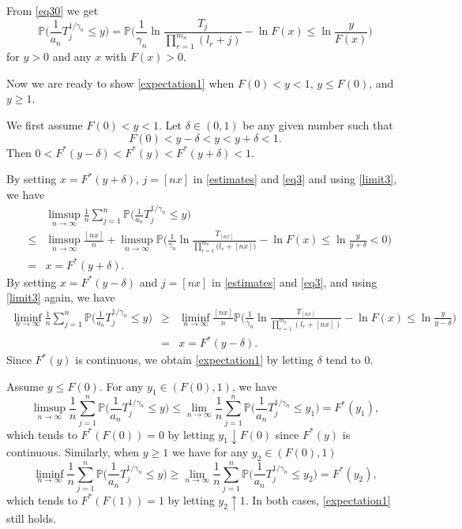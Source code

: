 \documentclass[11pt]{article}
\numberwithin{equation}{section}
\begin{document}
From \eqref{eq30} we get
\begin{equation}\label{eq3}
\mathbb{P}\Big(\frac{1}{a_n}T_j^{1 / \gamma_{n}} \leq y\Big)=
\mathbb{P}\Big(\frac{1}{\gamma_{n}} \ln
\frac{T_{j}}{\prod_{r=1}^{m_{n}}\left(l_{r}+j\right)}-\ln F(x) \leq
\ln \frac{y}{F(x)}\Big)
\end{equation}
for $y>0$ and any $x$ with $F(x)>0$.


Now we are ready to show \eqref{expectation1} when $F(0)<y<1$,
$y\leq F(0)$,  and $y\geq 1$.


We first assume $F(0)<y<1$.  Let $\delta \in(0,1)$ be any given
number such that
\[F(0)< y-\delta<y<y+\delta<1.\]
Then $0<F^{*}(y-\delta)<F^{*}(y)<F^{*}(y+\delta)<1$.

By setting $x=F^{*}(y+\delta)$, $j=[nx]$ in \eqref{estimates} and
\eqref{eq3} and using \eqref{limit3},  we have
\begin{eqnarray*}
&& \limsup_{n \rightarrow \infty}  \frac{1}{n} \sum_{j=1}^{n} \mathbb{P}\Big(\frac{1}{a_n}T_j^{1 / \gamma_{n}} \leq y\Big)\\
&\leq& \limsup _{n \rightarrow \infty}  \frac{[nx]}{n}+ \limsup _{n
\rightarrow \infty}  \mathbb{P}\Big(\frac{1}{\gamma_{n}} \ln
\frac{T_{[nx]}}{\prod_{r=1}^{m_{n}}\Big(l_{r}+[nx]\Big)}-\ln F(x)
\leq  \ln \frac{y}{y+\delta}<0\Big)\\
&=&x=F^{*}(y+\delta).
\end{eqnarray*}
By setting $x=F^{*}(y-\delta)$ and $j=[nx]$ in \eqref{estimates} and
\eqref{eq3}, and using \eqref{limit3} again, we have
\begin{eqnarray*}
 \liminf _{n \rightarrow \infty}\frac{1}{n}\sum_{j=1}^{n} \mathbb{P}\Big(\frac{1}{a_n}T_j^{1 / \gamma_{n}} \leq y\big)
&\ge& \liminf _{n \rightarrow \infty}\frac{[nx]}{n}
\mathbb{P}\Big(\frac{1}{\gamma_{n}}
    \ln \frac{T_{[nx]}}{\prod_{r=1}^{m_{n}}\left(l_{r}+[nx]\right)}-\ln F(x)
    \leq  \ln \frac{y}{y-\delta}\Big)\\
    &=&x=F^{*}(y-\delta).
\end{eqnarray*}
Since $F^*(y)$ is continuous, we obtain \eqref{expectation1} by
letting $\delta$ tend to $0$.

Assume $y\leq F(0)$. For any $y_1 \in (F(0),1)$, we have
\[
\limsup_{n\to\infty}\frac{1}{n} \sum_{j=1}^{n}
\mathbb{P}\Big(\frac{1}{a_{n}} T_{j}^{1 / \gamma_{n}} \leqslant
y\Big)\leq \lim_{n\to\infty}\frac{1}{n}\sum_{j=1}^{n}
\mathbb{P}\Big(\frac{1}{a_{n}} T_{j}^{1 / \gamma_{n}} \leqslant
y_1\Big)= F^*(y_1),
\]
which tends to  $F^*(F(0))=0$ by letting $y_1\downarrow F(0)$ since
$F^*(y)$ is continuous. Similarly, when $y\geq 1$ we have for any
$y_2 \in (F(0),1)$
\[
\liminf_{n\to\infty}\frac{1}{n} \sum_{j=1}^{n}
\mathbb{P}\Big(\frac{1}{a_{n}} T_{j}^{1 / \gamma_{n}} \leqslant
y\Big)\ge \lim_{n\to\infty}\frac{1}{n}\sum_{j=1}^{n}
\mathbb{P}\Big(\frac{1}{a_{n}} T_{j}^{1 / \gamma_{n}} \leqslant
y_2\Big)= F^*(y_2),
\]
which tends to  $F^*(F(1))=1$ by letting $y_2\uparrow 1$.  In both
cases, \eqref{expectation1} still holds.
\end{document}
